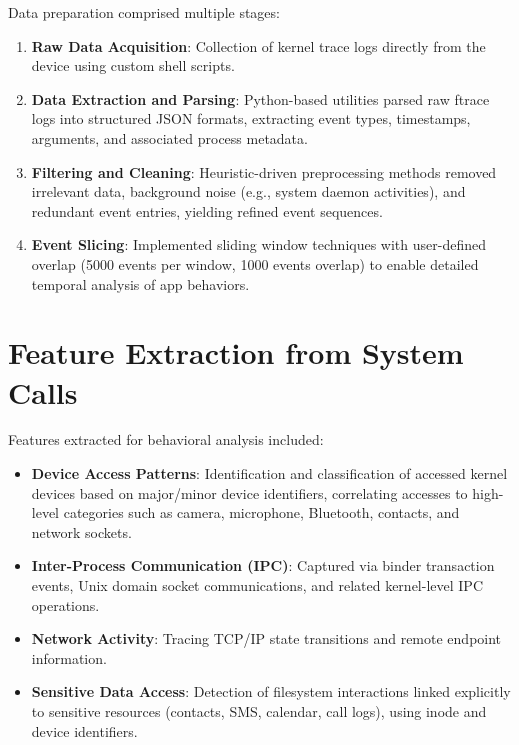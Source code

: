 \documentclass[a4paper,12pt]{report}
\begin{document}
Data preparation comprised multiple stages:
\begin{enumerate}
\item \textbf{Raw Data Acquisition}: Collection of kernel trace logs directly from the device using custom shell scripts.
\item \textbf{Data Extraction and Parsing}: Python-based utilities parsed raw ftrace logs into structured JSON formats, extracting event types, timestamps, arguments, and associated process metadata.
\item \textbf{Filtering and Cleaning}: Heuristic-driven preprocessing methods removed irrelevant data, background noise (e.g., system daemon activities), and redundant event entries, yielding refined event sequences.
\item \textbf{Event Slicing}: Implemented sliding window techniques with user-defined overlap (5000 events per window, 1000 events overlap) to enable detailed temporal analysis of app behaviors.
\end{enumerate}

\section{Feature Extraction from System Calls}
Features extracted for behavioral analysis included:
\begin{itemize}
\item \textbf{Device Access Patterns}: Identification and classification of accessed kernel devices based on major/minor device identifiers, correlating accesses to high-level categories such as camera, microphone, Bluetooth, contacts, and network sockets.
\item \textbf{Inter-Process Communication (IPC)}: Captured via binder transaction events, Unix domain socket communications, and related kernel-level IPC operations.
\item \textbf{Network Activity}: Tracing TCP/IP state transitions and remote endpoint information.
\item \textbf{Sensitive Data Access}: Detection of filesystem interactions linked explicitly to sensitive resources (contacts, SMS, calendar, call logs), using inode and device identifiers.
\end{itemize}
\end{document}
